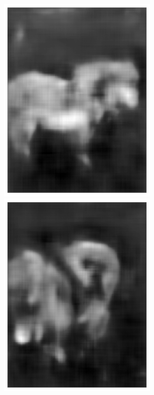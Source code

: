 \documentclass{l4proj}
\begin{document}
\begin{figure}[ht]
\begin{subfigure}[h!]{0.22\textwidth}
    \includegraphics[width=\textwidth]{images/autoencoder/pony_1/auto.png}
    \includegraphics[width=\textwidth]{images/autoencoder/pony_2/auto.png}

\end{subfigure}
\end{figure}
\end{document}
